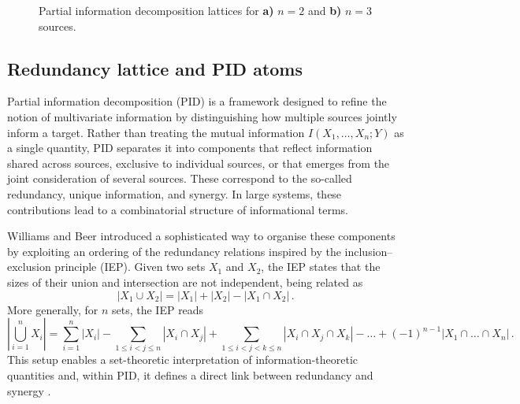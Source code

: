 \documentclass{article}
\newcommand{\Xs}{X_1,\ldots,X_n}
\begin{document}
\begin{figure}[t]
    \centering
    \begin{subfigure}[c]{0.38\textwidth}
        \centering
        
        \label{fig:pid-n2}
    \end{subfigure}
    \hfill
    \begin{subfigure}[c]{0.58\textwidth}
        \centering
        
        \label{fig:pid-n3}
    \end{subfigure}
    \caption{Partial information decomposition lattices for \textbf{a)} $n=2$ and \textbf{b)} $n=3$ sources.}
    \label{fig:pid-lattices}
\end{figure}


\subsection{Redundancy lattice and PID atoms}
Partial information decomposition (PID) is a framework designed to refine the notion of multivariate information by distinguishing how multiple sources jointly inform a target. Rather than treating the mutual information $I(\Xs;Y)$ as a single quantity, PID separates it into components that reflect information shared across sources, exclusive to individual sources, or that emerges from the joint consideration of several sources. These correspond to the so-called redundancy, unique information, and synergy. In large systems, these contributions lead to a combinatorial structure of informational terms.

Williams and Beer introduced a sophisticated way to organise these components by exploiting an ordering of the redundancy relations inspired by the inclusion–exclusion principle (IEP). 
Given two sets $X_1$ and $X_2$, the IEP states that the sizes of their union and intersection are not independent, being related as
\begin{equation}
    |X_1\cup X_2| = |X_1|+|X_2|-|X_1\cap X_2| \,.
\end{equation}
More generally, for $n$ sets, the IEP reads
\begin{equation}
\left| \bigcup_{i=1}^{n} X_i \right| = \sum_{i=1}^{n} |X_i| - \sum_{1 \le i < j \le n} \left |X_i \cap X_j\right | + \sum_{1 \le i < j < k \le n} |X_i \cap X_j \cap X_k| - \dots + (-1)^{n-1} |X_1 \cap \dots \cap X_n| \,.
\end{equation}
This setup enables a set-theoretic interpretation of information-theoretic quantities \cite{mcgill1954multivariate, yeung1991new} and, within PID, it defines a direct link between redundancy and synergy \cite{williams2010nonnegative}.
\end{document}
